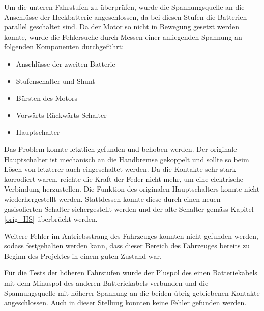 Um die unteren Fahrstufen zu überprüfen, wurde die Spannungsquelle an die Anschlüsse der Heckbatterie angeschlossen, da bei diesen Stufen die Batterien parallel geschaltet sind. Da der Motor so nicht in Bewegung gesetzt werden konnte, wurde die Fehlersuche durch Messen einer anliegenden Spannung an folgenden Komponenten durchgeführt: \newpage\begin{itemize}
	\item Anschlüsse der zweiten Batterie
	\item Stufenschalter und Shunt
	\item Bürsten des Motors
	\item Vorwärts-Rückwärts-Schalter
	\item Hauptschalter
\end{itemize}

Das Problem konnte letztlich gefunden und behoben werden. Der originale Hauptschalter ist mechanisch an die Handbremse gekoppelt und sollte so beim Lösen von letzterer auch eingeschaltet werden. Da die Kontakte sehr stark korrodiert waren, reichte die Kraft der Feder nicht mehr, um eine elektrische Verbindung herzustellen. Die Funktion des originalen Hauptschalters konnte nicht wiederhergestellt werden. Stattdessen konnte diese durch einen neuen gasisolierten Schalter sichergestellt werden und der alte Schalter gemäss Kapitel \ref{orig_HS} überbrückt werden.

Weitere Fehler im Antriebsstrang des Fahrzeuges konnten nicht gefunden werden, sodass festgehalten werden kann, dass dieser Bereich des Fahrzeuges bereits zu Beginn des Projektes in einem guten Zustand war.

Für die Tests der höheren Fahrstufen wurde der Pluspol des einen Batteriekabels mit dem Minuspol des anderen Batteriekabels verbunden und die Spannungsquelle mit höherer Spannung an die beiden übrig gebliebenen Kontakte angeschlossen. Auch in dieser Stellung konnten keine Fehler gefunden werden.



\newpage